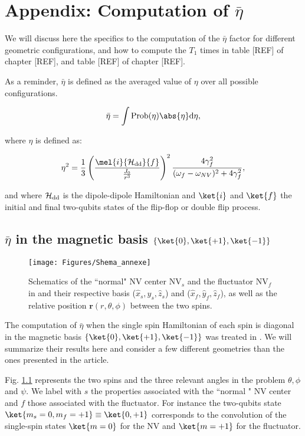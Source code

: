 \documentclass[a4paper,11pt]{report}
\title{}
\begin{document}
\chapter{Appendix: Computation of $\bar \eta$}
We will discuss here the specifics to the computation of the  $\bar \eta$ factor for different geometric configurations, and how to compute the $T_1$ times in table [REF] of chapter [REF], and table [REF] of chapter [REF].

As a reminder, $\bar \eta$ is defined as the averaged value of $\eta$ over all possible configurations.

\begin{equation}
\bar \eta = \int \rm{Prob}(\eta) \abs{\eta} d\eta,
\end{equation}

where $\eta$ is defined as:

\begin{equation}
\label{eq. eta debut annexe}
\eta^2=\frac{1}{3} \left(\frac{\mel{i}{\mathcal{H_{\rm dd}}}{f}}{\frac{J_0}{r^3}}\right)^2 \frac{4\gamma_f^2}{(\omega_f - \omega_{NV})^2+4\gamma_f^2},
\end{equation}

and where $\mathcal{H_{\rm dd}}$ is the dipole-dipole Hamiltonian and $\ket{i}$ and $\ket{f}$ the initial and final two-qubits states of the flip-flop or double flip process.

\section{$\bar \eta$ in the magnetic basis $\{ \ket{0}, \ket{+1}, \ket{-1}\}$}

\begin{figure}[h]
\centering
\texttt{[image: Figures/Shema\_annexe]}
\caption{Schematics of the ``normal" NV center NV$_s$ and the fluctuator NV$_f$ in and their respective basis ($\hat x_s,\hat y_s,\hat z_s$) and ($\hat x_f,\hat y_f,\hat z_f$), as well as the relative position $\mathbf{r}(r,\theta,\phi)$ between the two spins.}
\label{shema spins annexe}
\end{figure}

The computation of $\bar \eta$ when the single spin Hamiltonian of each spin is diagonal in the magnetic basis $\{ \ket{0}, \ket{+1}, \ket{-1}\}$ was treated in \citep{choi2017depolarization}. We will summarize their results here and consider a few different geometries than the ones presented in the article.

Fig. \ref{shema spins annexe} represents the two spins and the three relevant angles in the problem $\theta,\phi$ and $\psi$. We label with $s$ the properties associated with the ``normal " NV center and $f$ those associated with the fluctuator. For instance the two-qubits state $\ket{m_s=0,m_f=+1}\equiv\ket{0,+1}$ corresponds to the convolution of the single-spin states $\ket{m=0}$ for the NV and $\ket{m=+1}$ for the fluctuator.
\end{document}
